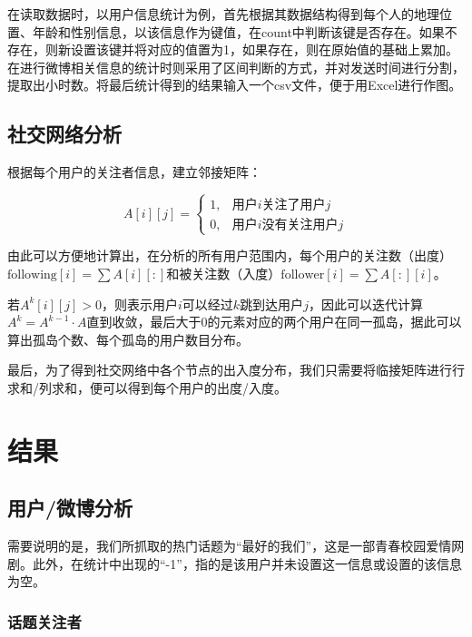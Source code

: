 \documentclass[a4paper,UTF8]{ctexart}
\begin{document}
在读取数据时，以用户信息统计为例，首先根据其数据结构得到每个人的地理位置、年龄和性别信息，以该信息作为键值，在count中判断该键是否存在。如果不存在，则新设置该键并将对应的值置为1，如果存在，则在原始值的基础上累加。在进行微博相关信息的统计时则采用了区间判断的方式，并对发送时间进行分割，提取出小时数。将最后统计得到的结果输入一个csv文件，便于用Excel进行作图。

\subsection{社交网络分析}\label{ux793eux4ea4ux7f51ux7edcux5206ux6790}

根据每个用户的关注者信息，建立邻接矩阵：

\[
A[i][j] = \begin{cases}
1,& \text{用户$i$关注了用户$j$}\\
0,& \text{用户$i$没有关注用户$j$}
\end{cases}
\]

由此可以方便地计算出，在分析的所有用户范围内，每个用户的关注数（出度）\(\text{following}[i] = \sum{A[i][:]}\)和被关注数（入度）\(\text{follower}[i] = \sum{A[:][i]}\)。

若\(A^k[i][j]>0\)，则表示用户\(i\)可以经过\(k\)跳到达用户\(j\)，因此可以迭代计算\(A^k = A^{k-1}\cdot A\)直到收敛，最后大于0的元素对应的两个用户在同一孤岛，据此可以算出孤岛个数、每个孤岛的用户数目分布。

最后，为了得到社交网络中各个节点的出入度分布，我们只需要将临接矩阵进行行求和/列求和，便可以得到每个用户的出度/入度。

\section{结果}\label{ux7ed3ux679c}

\subsection{用户/微博分析}\label{ux7528ux6237ux5faeux535aux5206ux6790}

需要说明的是，我们所抓取的热门话题为``最好的我们''，这是一部青春校园爱情网剧。此外，在统计中出现的``-1''，指的是该用户并未设置这一信息或设置的该信息为空。

\subsubsection{话题关注者}\label{ux8bddux9898ux5173ux6ce8ux8005}
\end{document}

